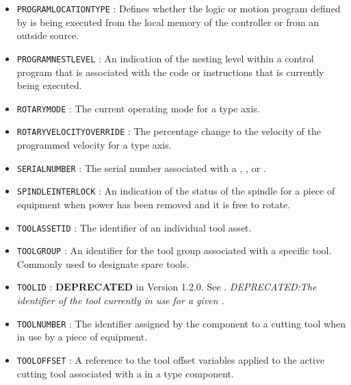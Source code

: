 \begin{itemize}
\item \texttt{PROGRAM\textunderscore LOCATION\textunderscore TYPE} : Defines whether the logic or motion program defined by  is being executed from the local memory of the controller or from an outside source. 

\item \texttt{PROGRAM\textunderscore NEST\textunderscore LEVEL} : An indication of the nesting level within a control program that is associated with the code or instructions that is currently being executed. 

\item \texttt{ROTARY\textunderscore MODE} : The current operating mode for a  type axis. 

\item \texttt{ROTARY\textunderscore VELOCITY\textunderscore OVERRIDE} : The percentage change to the velocity of the programmed velocity for a  type axis. 

\item \texttt{SERIAL\textunderscore NUMBER} : The serial number associated with a , , or . 

\item \texttt{SPINDLE\textunderscore INTERLOCK} : An indication of the status of the spindle for a piece of equipment when power has been removed and it is free to rotate. 

\item \texttt{TOOL\textunderscore ASSET\textunderscore ID} : The identifier of an individual tool asset. 

\item \texttt{TOOL\textunderscore GROUP} : An identifier for the tool group associated with a specific tool. Commonly used to designate spare tools. 

\item \texttt{TOOL\textunderscore ID} : \textbf{DEPRECATED} in Version 1.2.0.   See . \textit{DEPRECATED:The identifier of the tool currently in use for a given .} 

\item \texttt{TOOL\textunderscore NUMBER} : The identifier assigned by the  component to a cutting tool when in use by a piece of equipment. 

\item \texttt{TOOL\textunderscore OFFSET} : A reference to the tool offset variables applied to the active cutting tool associated with a  in a  type component. 


\end{itemize}
